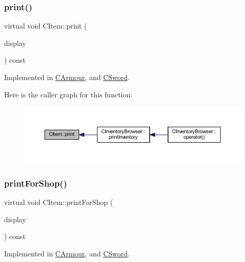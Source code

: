 \subsubsection{\texorpdfstring{print()}{print()}}
{\footnotesize\ttfamily virtual void C\+Item\+::print (\begin{DoxyParamCaption}\item[{const \mbox{\hyperlink{class_c_display}{C\+Display}} \&}]{display }\end{DoxyParamCaption}) const\hspace{0.3cm}{\ttfamily [pure virtual]}}



Implemented in \mbox{\hyperlink{class_c_armour_a169305bd938dfcf38365883b65312068}{C\+Armour}}, and \mbox{\hyperlink{class_c_sword_a8d8f4502742e5905d2be1f4d0157b6be}{C\+Sword}}.

Here is the caller graph for this function\+:\nopagebreak
\begin{figure}[H]
\begin{center}
\leavevmode
\includegraphics[width=350pt]{class_c_item_af35b9c64f05a8377298505b3a81bcd18_icgraph}
\end{center}
\end{figure}
\mbox{\label{class_c_item_af56df4ab4d87984c56401231dd3492cf}} 
\subsubsection{\texorpdfstring{print\+For\+Shop()}{printForShop()}}
{\footnotesize\ttfamily virtual void C\+Item\+::print\+For\+Shop (\begin{DoxyParamCaption}\item[{const \mbox{\hyperlink{class_c_display}{C\+Display}} \&}]{display }\end{DoxyParamCaption}) const\hspace{0.3cm}{\ttfamily [pure virtual]}}



Implemented in \mbox{\hyperlink{class_c_armour_a3abc5a20200d572d920737aec75bb196}{C\+Armour}}, and \mbox{\hyperlink{class_c_sword_a7871b74b03a5ee130925e7f20d8107ef}{C\+Sword}}.

